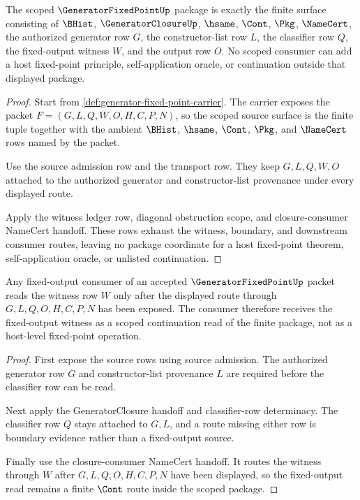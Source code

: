 \begin{theorem}
\label{thm:generatorfixedpoint-scope-package}
The scoped $\GeneratorFixedPointUp$ package is exactly the finite surface consisting of $\BHist$, $\GeneratorClosureUp$, $\hsame$, $\Cont$, $\Pkg$, $\NameCert$, the authorized generator row $G$, the constructor-list row $L$, the classifier row $Q$, the fixed-output witness $W$, and the output row $O$. No scoped consumer can add a host fixed-point principle, self-application oracle, or continuation outside that displayed package.
\end{theorem}
\begin{proof}
Start from \autoref{def:generator-fixed-point-carrier}. The carrier exposes the packet $F=(G,L,Q,W,O,H,C,P,N)$, so the scoped source surface is the finite tuple together with the ambient $\BHist$, $\hsame$, $\Cont$, $\Pkg$, and $\NameCert$ rows named by the packet.

Use the source admission row and the transport row. They keep $G,L,Q,W,O$ attached to the authorized generator and constructor-list provenance under every displayed route.

Apply the witness ledger row, diagonal obstruction scope, and closure-consumer NameCert handoff. These rows exhaust the witness, boundary, and downstream consumer routes, leaving no package coordinate for a host fixed-point theorem, self-application oracle, or unlisted continuation.
\end{proof}

\begin{theorem}
\label{thm:generatorfixedpoint-cont-fixedpoint-scope}
Any fixed-output consumer of an accepted $\GeneratorFixedPointUp$ packet reads the witness row $W$ only after the displayed route through $G,L,Q,O,H,C,P,N$ has been exposed. The consumer therefore receives the fixed-output witness as a scoped continuation read of the finite package, not as a host-level fixed-point operation.
\end{theorem}
\begin{proof}
First expose the source rows using source admission. The authorized generator row $G$ and constructor-list provenance $L$ are required before the classifier row can be read.

Next apply the GeneratorClosure handoff and classifier-row determinacy. The classifier row $Q$ stays attached to $G,L$, and a route missing either row is boundary evidence rather than a fixed-output source.

Finally use the closure-consumer NameCert handoff. It routes the witness through $W$ after $G,L,Q,O,H,C,P,N$ have been displayed, so the fixed-output read remains a finite $\Cont$ route inside the scoped package.
\end{proof}

